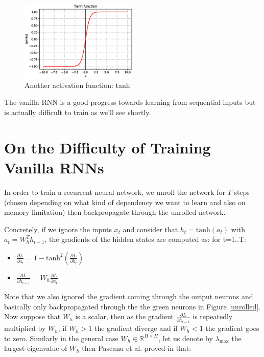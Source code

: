 \begin{figure}[H]
    \centering
    \includegraphics[width=0.5\textwidth]{Images/tanh.eps}
    \caption{Another activation function: tanh}
    \label{tanh}
\end{figure}

The vanilla RNN is a good progress towards learning from sequential inputs but is actually difficult to train as we'll see shortly.

\section{On the Difficulty of Training Vanilla RNNs}
In order to train a recurrent neural network, we unroll the network for $T$ steps (chosen depending on what kind of dependency we want to learn and also on memory limitation) then backpropagate through the unrolled network.

Concretely, if we ignore the inputs $x_t$ and consider that $h_t = \text{tanh}(a_t)$ with $a_t = W_h^T h_{t-1}$, the gradients of the hidden states are computed as: for t=1..T:
\begin{itemize}
    \item $\frac{\partial L}{\partial a_t} = 1 - \text{tanh}^2(\frac{\partial L}{\partial h_t})$
    \item $\frac{\partial L}{\partial h_{t-1}} = W_h \frac{\partial L}{\partial a_t}$
\end{itemize}

Note that we also ignored the gradient coming through the output neurons and basically only backpropagated through the the green neurons in Figure \ref{unrolled}. Now suppose that $W_h$ is a scalar, then as the gradient $\frac{\partial L}{\partial h_{t-1}}$ is repeatedly multiplied by $W_h$, if $W_h > 1$ the gradient diverge and if $W_h < 1$ the gradient goes to zero. Similarly in the general case $W_h \in \mathbb{R}^{H\times H}$, let us denote by $\lambda_{\text{max}}$ the largest eigenvalue of $W_h$ then Pascanu et al. proved in \cite{difficulty-rnn} that:


